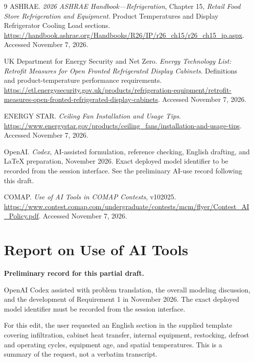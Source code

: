 \documentclass[12pt]{article}
\begin{document}
\clearpage
{}
{}
\begin{thebibliography}{9}
ASHRAE. \emph{2026 ASHRAE Handbook---Refrigeration},
Chapter 15, \emph{Retail Food Store Refrigeration and Equipment}.
Product Temperatures and Display Refrigerator Cooling Load sections.
\url{https://handbook.ashrae.org/Handbooks/R26/IP/r26_ch15/r26_ch15_ip.aspx}.
Accessed November 7, 2026.

UK Department for Energy Security and Net Zero.
\emph{Energy Technology List: Retrofit Measures for Open Fronted Refrigerated Display Cabinets}.
Definitions and product-temperature performance requirements.
\url{https://etl.energysecurity.gov.uk/products/refrigeration-equipment/retrofit-measures-open-fronted-refrigerated-display-cabinets}.
Accessed November 7, 2026.

ENERGY STAR. \emph{Ceiling Fan Installation and Usage Tips}.
\url{https://www.energystar.gov/products/ceiling_fans/installation-and-usage-tips}.
Accessed November 7, 2026.

OpenAI. \emph{Codex}, AI-assisted formulation, reference checking,
English drafting, and LaTeX preparation, November 2026.
Exact deployed model identifier to be recorded from the session interface.
See the preliminary AI-use record following this draft.

COMAP. \emph{Use of AI Tools in COMAP Contests}, v102025.
\url{https://www.contest.comap.com/undergraduate/contests/mcm/flyer/Contest_AI_Policy.pdf}.
Accessed November 7, 2026.
\end{thebibliography}

\clearpage
{}
{}
\section*{Report on Use of AI Tools}
\noindent\textbf{Preliminary record for this partial draft.}

OpenAI Codex assisted with problem translation, the overall modeling discussion,
and the development of Requirement 1 in November 2026. The exact deployed model
identifier must be recorded from the session interface.

For this edit, the user requested an English section in the supplied template
covering infiltration, cabinet heat transfer, internal equipment, restocking,
defrost and operating cycles, equipment age, and spatial temperatures. This is
a summary of the request, not a verbatim transcript.
\end{document}
